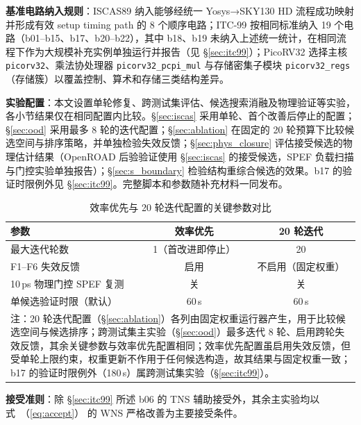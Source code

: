 \documentclass[twocolumn,10pt,fontset=windows]{ctexart}
\renewcommand{\eqref}[1]{\textup{（\ref{#1}）}}
\begin{document}
\textbf{基准电路纳入规则}：ISCAS89 纳入能够经统一 Yosys→SKY130 HD 流程成功映射并形成有效 setup timing path 的 8 个顺序电路；ITC-99 按相同标准纳入 19 个电路（b01--b15、b17、b20--b22），其中 b18、b19 未纳入上述统一统计，在相同流程下作为大规模补充实例单独运行并报告（见 \S\ref{sec:itc99}）；PicoRV32 选择主核 \texttt{picorv32}、乘法协处理器 \texttt{picorv32\_pcpi\_mul} 与存储密集子模块 \texttt{picorv32\_regs}（存储簇）以覆盖控制、算术和存储三类结构差异。

\textbf{实验配置}：本文设置单轮修复、跨测试集评估、候选搜索消融及物理验证等实验，各小节结果仅在相同配置内比较。\S\ref{sec:iscas} 采用单轮、首个改善后停止的配置；\S\ref{sec:ood} 采用最多 8 轮的迭代配置；\S\ref{sec:ablation} 在固定的 20 轮预算下比较候选空间与排序策略，并单独检验失效反馈；\S\ref{sec:phys_closure} 评估接受候选的物理估计结果（OpenROAD 后验验证使用 \S\ref{sec:iscas} 的接受候选，SPEF 负载扫描与门控实验单独报告）；\S\ref{sec:s_boundary} 检验结构重综合候选的效果。b17 的验证时限例外见 \S\ref{sec:itc99}。完整脚本和参数随补充材料一同发布。

\begin{table}[!htb]
\centering
\caption{效率优先与 20 轮迭代配置的关键参数对比}
\label{tab:configs}
\scriptsize
\setlength{\tabcolsep}{4pt}
\begin{tabular}{lcc}
\toprule
\textbf{参数} & \textbf{效率优先} & \textbf{20 轮迭代} \\
\midrule
最大迭代轮数                    & 1（首改进即停止） & 20 \\
F1--F6 失效反馈                  & 启用 & 不启用（固定权重） \\
10\,ps 物理门控 SPEF 复测        & 关 & 关 \\
单候选验证时限（默认）           & 60\,s & 60\,s \\
\bottomrule
\multicolumn{3}{p{0.95\columnwidth}}{\footnotesize 注：20 轮迭代配置（\S\ref{sec:ablation}）各列由固定权重运行器产生，用于比较候选空间与候选排序；跨测试集主实验（\S\ref{sec:ood}）最多迭代 8 轮、启用跨轮失效反馈，其余关键参数与效率优先配置相同；效率优先配置虽启用失效反馈，但受单轮上限约束，权重更新不作用于任何候选构造，故其结果与固定权重一致；b17 的验证时限例外（180\,s）属跨测试集实验（\S\ref{sec:itc99}）。}\\
\end{tabular}
\end{table}

\textbf{接受准则}：除 \S\ref{sec:itc99} 所述 b06 的 TNS 辅助接受外，其余主实验均以式~\eqref{eq:accept} 的 WNS 严格改善为主要接受条件。
\end{document}
